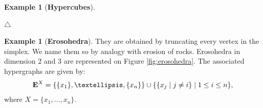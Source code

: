 \documentclass[11pt]{article}
\theoremstyle{definition}
\newtheorem{example}[theo]{Example}
\numberwithin{equation}{section}
\numberwithin{equation}{section}
\newcommand\xqed[1]{%
  \leavevmode\unskip\penalty9999 \hbox{}\nobreak\hfill
  \quad\hbox{#1}}
\newcommand\demo{\xqed{$\triangle$}}
\newcommand{\set}[1]{\{#1\}}
\newcommand{\setc}[2]{\set{#1 \mid #2}}
\newcommand{\hyper}[1]{{\bf #1}}
\begin{document}
\begin{example}[{\bf Hypercubes}]
\begin{center}
{
}\end{center} \demo
\end{example}
\begin{example}[{\bf Erosohedra}] \label{eroso} They are obtained by truncating every vertex in the simplex. We name them so by  analogy with erosion of rocks. Erosohedra in dimension 2 and 3 are represented on Figure \ref{fig:erosohedra}. The associated hypergraphs are given by:
\begin{align*}
 \hyper{E}^X=\{\{x_1\},\dots,\{x_n\}\}\cup\setc{\setc{x_j}{j \neq i}}{1\leq i\leq n},
\end{align*} 
where $X=\{x_1, \ldots, x_n\}$.


\end{example}
\end{document}
